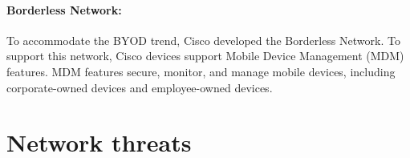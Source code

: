 \paragraph{Borderless Network:} To accommodate the BYOD trend, Cisco developed the Borderless Network. To support this network, Cisco devices support Mobile Device Management (MDM) features. MDM features secure, monitor, and manage mobile devices, including corporate-owned devices and employee-owned devices. 
%

\section{Network threats}



